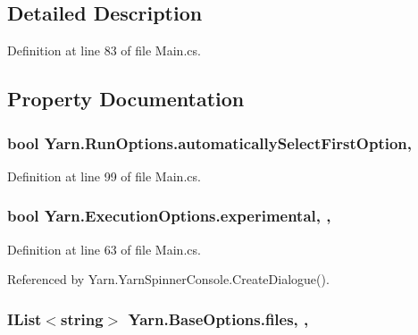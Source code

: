 \subsection{Detailed Description}


Definition at line 83 of file Main.\-cs.



\subsection{Property Documentation}
\hypertarget{a00159_ae21d271c37dabee023771a951f6e774e}{
\subsubsection[{automatically\-Select\-First\-Option}]{\setlength{\rightskip}{0pt plus 5cm}bool Yarn.\-Run\-Options.\-automatically\-Select\-First\-Option\hspace{0.3cm}{\ttfamily [get]}, {\ttfamily [set]}}}\label{a00159_ae21d271c37dabee023771a951f6e774e}


Definition at line 99 of file Main.\-cs.

\hypertarget{a00105_ad97950e47ce2aaeb598295b7c3c44b13}{
\subsubsection[{experimental}]{\setlength{\rightskip}{0pt plus 5cm}bool Yarn.\-Execution\-Options.\-experimental\hspace{0.3cm}{\ttfamily [get]}, {\ttfamily [set]}, {\ttfamily [inherited]}}}\label{a00105_ad97950e47ce2aaeb598295b7c3c44b13}


Definition at line 63 of file Main.\-cs.



Referenced by Yarn.\-Yarn\-Spinner\-Console.\-Create\-Dialogue().

\hypertarget{a00043_aa93cbb1bc1d5328e0a417012621e92d2}{
\subsubsection[{files}]{\setlength{\rightskip}{0pt plus 5cm}I\-List$<$string$>$ Yarn.\-Base\-Options.\-files\hspace{0.3cm}{\ttfamily [get]}, {\ttfamily [set]}, {\ttfamily [inherited]}}}\label{a00043_aa93cbb1bc1d5328e0a417012621e92d2}


